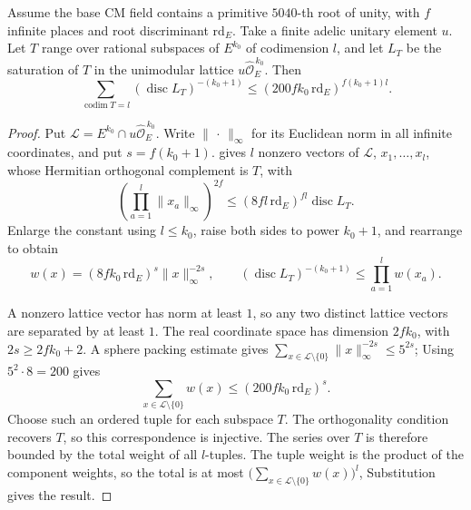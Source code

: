 \begin{lemma}
\label{lem:b-subspace-height-zeta}
\emitthmsource
Assume the base CM field contains a primitive $5040$-th root of unity, with $f$ infinite places and root discriminant $\mathrm{rd}_E$.
Take a finite adelic unitary element $u$. Let $T$ range over rational subspaces of $E^{k_0}$ of codimension $l$,
and let $L_T$ be the saturation of $T$ in the unimodular lattice $u\widehat{\mathcal O}_E^{\,k_0}$. Then
\[
 \sum_{\operatorname{codim}T=l}
        (\operatorname{disc}L_T)^{-(k_0+1)}
 \le (200 f k_0\,\mathrm{rd}_E)^{f(k_0+1)l}.
\]
\end{lemma}
\begin{proof}
Put $\mathcal L=E^{k_0}\cap u\widehat{\mathcal O}_E^{\,k_0}$.
Write $\|\,\cdot\,\|_\infty$ for its Euclidean norm in all infinite coordinates,
and put $s=f(k_0+1)$.  gives $l$ nonzero vectors of $\mathcal L$,
$x_1,\dots,x_l$, whose Hermitian orthogonal complement is $T$, with
\[
 \left(\prod_{a=1}^l\|x_a\|_\infty\right)^{2f}
     \le (8 f l\,\mathrm{rd}_E)^{fl}\operatorname{disc}L_T.
\]
Enlarge the constant using $l\le k_0$, raise both sides to power $k_0+1$, and rearrange to obtain
\[
 w(x)=(8 f k_0\,\mathrm{rd}_E)^s\|x\|_\infty^{-2s},
 \qquad
 (\operatorname{disc}L_T)^{-(k_0+1)}\le\prod_{a=1}^l w(x_a).
\]

A nonzero lattice vector has norm at least $1$, so any two distinct lattice vectors are separated by at least $1$.
The real coordinate space has dimension $2fk_0$, with $2s\ge 2fk_0+2$. A sphere packing estimate gives
$\sum_{x\in\mathcal L\setminus\{0\}}\|x\|_\infty^{-2s}\le5^{2s}$;
Using $5^2\cdot8=200$ gives
\[
 \sum_{x\in\mathcal L\setminus\{0\}}w(x)\le (200 f k_0\,\mathrm{rd}_E)^s.
\]
Choose such an ordered tuple for each subspace $T$. The orthogonality condition recovers $T$, so this correspondence is injective.
The series over $T$ is therefore bounded by the total weight of all $l$-tuples.
The tuple weight is the product of the component weights, so the total is at most
$\bigl(\sum_{x\in\mathcal L\setminus\{0\}}w(x)\bigr)^l$,
Substitution gives the result.
\end{proof}

